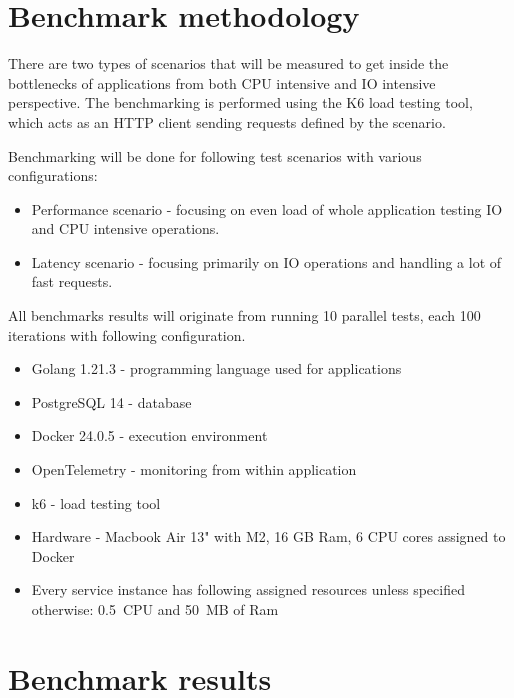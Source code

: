 
\section{Benchmark methodology}
There are two types of scenarios that will be measured to get inside the bottlenecks of applications from both CPU intensive and IO intensive perspective. The benchmarking is performed using the K6 load testing tool, which acts as an HTTP client sending requests defined by the scenario.

Benchmarking will be done for following test scenarios with various configurations:
\begin{itemize}
    \item Performance scenario - focusing on even load of whole application testing IO and CPU intensive operations.
    \item Latency scenario - focusing primarily on IO operations and handling a lot of fast requests.
\end{itemize}

All benchmarks results will originate from running 10 parallel tests, each 100 iterations with following configuration.
\begin{itemize}
    \item Golang 1.21.3 - programming language used for applications
    \item PostgreSQL 14 - database
    \item Docker 24.0.5 - execution environment
    \item OpenTelemetry - monitoring from within application
    \item k6 - load testing tool
    \item Hardware - Macbook Air 13" with M2, 16 GB Ram, 6 CPU cores assigned to Docker
    \item Every service instance has following assigned resources unless specified otherwise: 0.5~CPU and 50~MB of Ram
\end{itemize}


\section{Benchmark results}
\label{section:benchmark_results}


